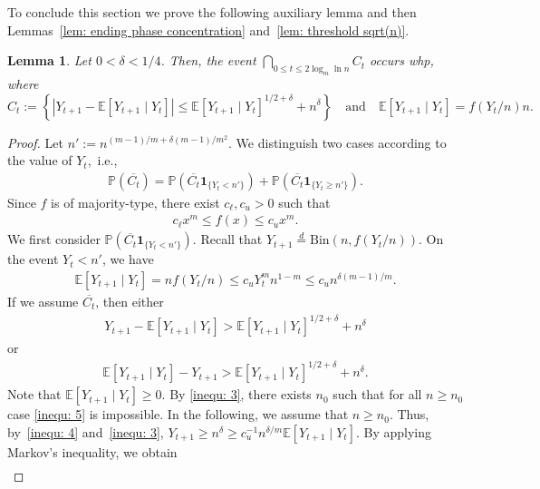 \documentclass[11pt]{article}
\newcommand{\Bin}{\mathrm{Bin}}
\newcommand{\Prob}{\mathbb{P}}
\numberwithin{theorem}{section}
\newtheorem{lemma}[theorem]{Lemma}
\begin{document}
\medskip
\noindent
To conclude this section we prove the following auxiliary lemma and then Lemmas~\ref{lem: ending phase concentration} and~\ref{lem: threshold sqrt(n)}.
\begin{lemma}\label{lem: aux lem 2.5}
Let $0 < \delta < 1/4$. Then, the event $\bigcap_{0 \le t \le 2\log_m\ln n}C_t$ occurs whp, where
\[
    C_t := \left \{\left|Y_{t+1} - \mathbb{E}[Y_{t+1}\mid Y_t] \right| \leq  \mathbb{E}[Y_{t+1}\mid Y_t]^{1/2+\delta} + n^\delta \right \}
    \quad
    \text{and}
    \quad
    \mathbb{E}[Y_{t+1}\mid Y_t] = f(Y_t/n)n.
\]
\end{lemma}
\begin{proof} 
Let $n' := n^{(m-1)/m+\delta(m-1)/m^2}$. We distinguish two cases according to the value of $Y_{t}$,~i.e.,
\begin{align}
\label{equ: split C_t}
    \Prob(\overline{C_t}) = \Prob(\overline{C_t}\mathbf{1}_{\{Y_t < n'\}})+ \Prob(\overline{C_t}\mathbf{1}_{\{Y_t \geq n'\}}).
\end{align}
Since $f$ is of majority-type, there exist $c_\ell, c_u > 0$ such that 
\begin{align}
\label{inequ: monom bounds f}
    c_\ell x^m \leq f(x) \leq c_ux^m .
\end{align}
    We first consider $\Prob(\overline{C_t}\mathbf{1}_{\{Y_t < n'\}})$. Recall that $Y_{t+1}\stackrel{d}{=}\Bin(n,f(Y_t/n))$. On the event $Y_t < n'$, we have
    \begin{align}\label{inequ: 3}
    \mathbb{E}[Y_{t+1}\mid Y_t] = n f(Y_t/n) \leq c_u Y_t^m n^{1-m} \leq c_u n^{\delta (m-1)/m}.
    \end{align}
    If we assume $\overline{C_t}$, then either
    \begin{align}\label{inequ: 4}
    Y_{t+1} - \mathbb{E}[Y_{t+1} \mid Y_t] > \mathbb{E}[Y_{t+1}\mid Y_t]^{1/2+\delta} + n^\delta
    \end{align}
    or 
    \begin{align}\label{inequ: 5}
    \mathbb{E}[Y_{t+1} \mid Y_t]-Y_{t+1}>\mathbb{E}[Y_{t+1}\mid Y_t]^{1/2+\delta} + n^\delta.
    \end{align}
    Note that $\mathbb{E}[Y_{t+1} \mid Y_t]\geq0$.
    By \eqref{inequ: 3}, there exists $n_0$ such that for all $n\geq n_0$ case \eqref{inequ: 5} is impossible. In the following, we assume that $n\geq n_0$. Thus, by~\eqref{inequ: 4} and~\eqref{inequ: 3},
    $
    Y_{t+1} \geq n^{\delta} \geq c_u^{-1} n^{\delta/m}  \mathbb{E}[Y_{t+1}\mid Y_t].
    $
    By applying Markov's inequality, we obtain
    \begin{align}\label{inequ: first summand}

\end{align}
\end{proof}
\end{document}
